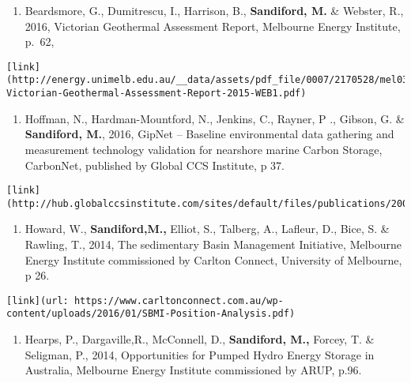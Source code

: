 \documentclass[
]{article}
\providecommand{\tightlist}{%
  \setlength{\itemsep}{0pt}\setlength{\parskip}{0pt}}
\begin{document}
\begin{enumerate}
\def\labelenumi{\arabic{enumi}.}
\tightlist
\item
  Beardsmore, G., Dumitrescu, I., Harrison, B., \textbf{Sandiford, M.}
  \& Webster, R., 2016, Victorian Geothermal Assessment Report,
  Melbourne Energy Institute, p.~62,
\end{enumerate}

\begin{verbatim}
[link](http://energy.unimelb.edu.au/__data/assets/pdf_file/0007/2170528/mel036-Victorian-Geothermal-Assessment-Report-2015-WEB1.pdf)
\end{verbatim}

\begin{enumerate}
\def\labelenumi{\arabic{enumi}.}
\tightlist
\item
  Hoffman, N., Hardman-Mountford, N., Jenkins, C., Rayner, P ., Gibson,
  G. \& \textbf{Sandiford, M.}, 2016, GipNet -- Baseline environmental
  data gathering and measurement technology validation for nearshore
  marine Carbon Storage, CarbonNet, published by Global CCS Institute, p
  37.
\end{enumerate}

\begin{verbatim}
[link](http://hub.globalccsinstitute.com/sites/default/files/publications/200408/GipNet%20Environmental%20Baseline%20Studies.pdf)
\end{verbatim}

\begin{enumerate}
\def\labelenumi{\arabic{enumi}.}
\tightlist
\item
  Howard, W., \textbf{Sandiford,M.,} Elliot, S., Talberg, A., Lafleur,
  D., Bice, S. \& Rawling, T., 2014, The sedimentary Basin Management
  Initiative, Melbourne Energy Institute commissioned by Carlton
  Connect, University of Melbourne, p 26.
\end{enumerate}

\begin{verbatim}
[link](url: https://www.carltonconnect.com.au/wp-content/uploads/2016/01/SBMI-Position-Analysis.pdf)
\end{verbatim}

\begin{enumerate}
\def\labelenumi{\arabic{enumi}.}
\tightlist
\item
  Hearps, P., Dargaville,R., McConnell, D., \textbf{Sandiford, M.,}
  Forcey, T. \& Seligman, P., 2014, Opportunities for Pumped Hydro
  Energy Storage in Australia, Melbourne Energy Institute commissioned
  by ARUP, p.96.
\end{enumerate}
\end{document}
